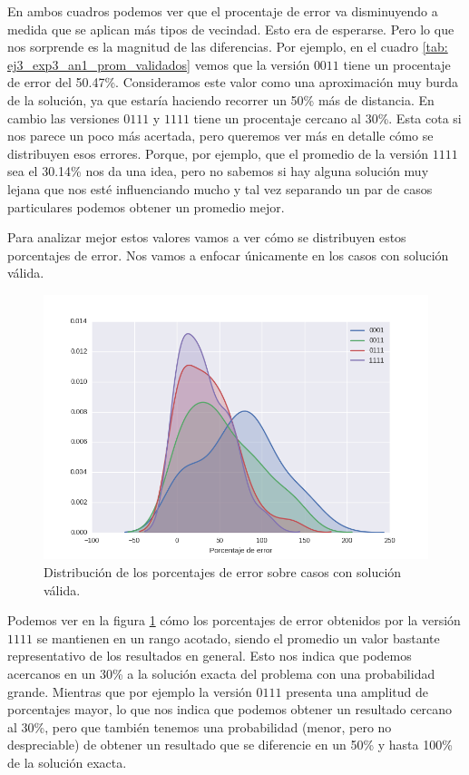 \par En ambos cuadros podemos ver que el procentaje de error va disminuyendo a medida que se aplican más tipos de vecindad. Esto era de esperarse. Pero lo que nos sorprende es la magnitud de las diferencias. Por ejemplo, en el cuadro \ref{tab: ej3_exp3_an1_prom_validados} vemos que la versión $0011$ tiene un procentaje de error del 50.47\%. Consideramos este valor como una aproximación muy burda de la solución, ya que estaría haciendo recorrer un 50\% más de distancia. En cambio las versiones $0111$ y $1111$ tiene un procentaje cercano al 30\%. Esta cota si nos parece un poco más acertada, pero queremos ver más en detalle cómo se distribuyen esos errores. Porque, por ejemplo, que el promedio de la versión $1111$ sea el 30.14\% nos da una idea, pero no sabemos si hay alguna solución muy lejana que nos esté influenciando mucho y tal vez separando un par de casos particulares podemos obtener un promedio mejor.

\par Para analizar mejor estos valores vamos a ver cómo se distribuyen estos porcentajes de error. Nos vamos a enfocar únicamente en los casos con solución válida.

\begin{figure}[H]
  \begin{center}
    \includegraphics[width=\textwidth]{img/ejercicio3/exp3_distribuciones.png}
    \caption{Distribución de los porcentajes de error sobre casos con solución válida.}
    \label{fig: ej3_exp3_an1_distr_validados}
  \end{center}
\end{figure}

\par Podemos ver en la figura \ref{fig: ej3_exp3_an1_distr_validados} cómo los porcentajes de error obtenidos por la versión $1111$ se mantienen en un rango acotado, siendo el promedio un valor bastante representativo de los resultados en general. Esto nos indica que podemos acercanos en un 30\% a la solución exacta del problema con una probabilidad grande. Mientras que por ejemplo la versión $0111$ presenta una amplitud de porcentajes mayor, lo que nos indica que podemos obtener un resultado cercano al 30\%, pero que también tenemos una probabilidad (menor, pero no despreciable) de obtener un resultado que se diferencie en un 50\% y hasta 100\% de la solución exacta.




